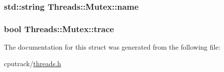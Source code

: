 \subsubsection[{\texorpdfstring{name}{name}}]{\setlength{\rightskip}{0pt plus 5cm}std\+::string Threads\+::\+Mutex\+::name}\hypertarget{struct_threads_1_1_mutex_aaf5798d7b45f171dbfa965e0508b884f}{}\label{struct_threads_1_1_mutex_aaf5798d7b45f171dbfa965e0508b884f}
\subsubsection[{\texorpdfstring{trace}{trace}}]{\setlength{\rightskip}{0pt plus 5cm}bool Threads\+::\+Mutex\+::trace}\hypertarget{struct_threads_1_1_mutex_af7d136f3d4aadf1a23fc72e93b8a98a3}{}\label{struct_threads_1_1_mutex_af7d136f3d4aadf1a23fc72e93b8a98a3}


The documentation for this struct was generated from the following file\+:\begin{DoxyCompactItemize}
\item 
cputrack/\hyperlink{threads_8h}{threads.\+h}\end{DoxyCompactItemize}
